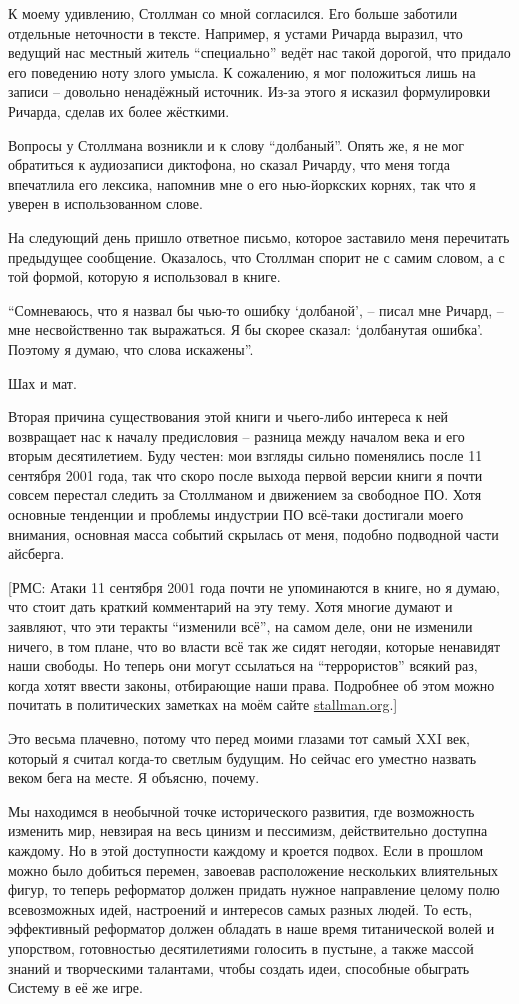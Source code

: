 К моему удивлению, Столлман со мной согласился. Его больше заботили
отдельные неточности в тексте. Например, я устами Ричарда выразил, что
ведущий нас местный житель ``специально'' ведёт нас такой дорогой,
что придало его поведению ноту злого умысла. К сожалению, я мог
положиться лишь на записи -- довольно ненадёжный источник. Из-за
этого я исказил формулировки Ричарда, сделав их более жёсткими.

Вопросы у Столлмана возникли и к слову ``долбаный''. Опять же, я не
мог обратиться к аудиозаписи диктофона, но сказал Ричарду, что меня
тогда впечатлила его лексика, напомнив мне о его нью-йоркских корнях,
так что я уверен в использованном слове.

На следующий день пришло ответное письмо, которое заставило меня
перечитать предыдущее сообщение. Оказалось, что Столлман спорит
не с самим словом, а с той формой, которую я использовал в книге.

``Сомневаюсь, что я назвал бы чью-то ошибку `долбаной', -- писал
мне Ричард, -- мне несвойственно так выражаться. Я бы скорее сказал:
`долбанутая ошибка'. Поэтому я думаю, что слова искажены''.

Шах и мат.

Вторая причина существования этой книги и чьего-либо интереса к
ней возвращает нас к началу предисловия -- разница между началом
века и его вторым десятилетием. Буду честен: мои взгляды сильно
поменялись после 11 сентября 2001 года, так что скоро после выхода
первой версии книги я почти совсем перестал следить за Столлманом
и движением за свободное ПО. Хотя основные тенденции и проблемы
индустрии ПО всё-таки достигали моего внимания, основная масса
событий скрылась от меня, подобно подводной части айсберга.

[РМС: Атаки 11 сентября 2001 года почти не упоминаются в книге,
 но я думаю, что стоит дать краткий комментарий на эту тему. Хотя
 многие думают и заявляют, что эти теракты ``изменили всё'', на
 самом деле, они не изменили ничего, в том плане, что во власти
 всё так же сидят негодяи, которые ненавидят наши свободы. Но
 теперь они могут ссылаться на ``террористов'' всякий раз, когда
 хотят ввести законы, отбирающие наши права. Подробнее об
 этом можно почитать в политических заметках на моём сайте
 \url{stallman.org}.]

Это весьма плачевно, потому что перед моими глазами тот самый
XXI век, который я считал когда-то светлым будущим. Но сейчас
его уместно назвать веком бега на месте. Я объясню, почему.

Мы находимся в необычной точке исторического развития, где
возможность изменить мир, невзирая на весь цинизм и пессимизм,
действительно доступна каждому. Но в этой доступности каждому
и кроется подвох. Если в прошлом можно было добиться перемен,
завоевав расположение нескольких влиятельных фигур, то теперь
реформатор должен придать нужное направление целому полю
всевозможных идей, настроений и интересов самых разных людей.
То есть, эффективный реформатор должен обладать в наше время
титанической волей и упорством, готовностью десятилетиями
голосить в пустыне, а также массой знаний и творческими талантами,
чтобы создать идеи, способные обыграть Систему в её же игре.

